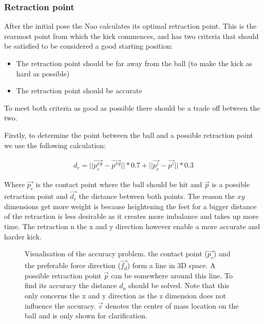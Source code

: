 \documentclass[a4paper]{article}
\begin{document}
\subsubsection{Retraction point}
After the initial pose the Nao calculates its optimal retraction point. This
is the rearmost point from which the kick commences, and has two criteria that
should be satisfied to be considered a good starting position:
\begin{itemize}
    \item The retraction point should be far away from the ball (to make the
        kick as hard as possible)
    \item The retraction point should be accurate 
\end{itemize}
To meet both criteria as good as possible there should be a trade off between
the two.

Firstly, to determine the point between the ball and a possible retraction point
we use the following calculation: 

\begin{align*}
    d_r = ||\vec{p_{c}^{xy}} - \vec{p^{xy}} || * 0.7 + ||\vec{p_{c}^z} - \vec{p^z}|| * 0.3
\end{align*}

Where $\vec{p_c}$ is the contact point where the ball should be hit and
$\vec{p}$ is a possible retraction point and $\vec{d_r}$ the distance between both
points. The reason the ${xy}$ dimensions get more weight is because heightening
the feet for a bigger distance of the retraction is less desirable as it creates
more imbalance and takes up more time. The retraction n the x and y direction
however enable a more accurate and harder kick.

\begin{figure}
    \caption{Visualisation of the accuracy problem. \small{the contact point
            ($\vec{p_c}$) and the preferable force direction ($\vec{f_d}$) form a line
    in 3D space. A possible retraction point $\vec{p}$ can be somewhere around
    this line. To find its accuracy the distance $d_a$ should be solved. Note that
    this only concerns the x and y direction as the z dimension does not
    influence the accuracy. $\vec{c}$ denotes the center of mass
    location on the ball and is only shown for clarification.}}
    \label{fig:accuracy}
\end{figure}    
\end{document}
